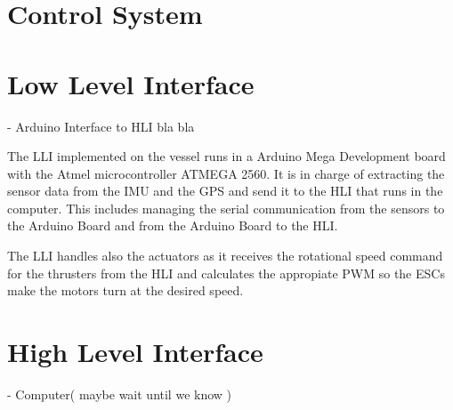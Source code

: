 \section{Control System}\label{sec:ControlComputation}

\section{Low Level Interface} - Arduino Interface to HLI bla bla

The LLI implemented on the vessel runs in a Arduino Mega Development board with the Atmel microcontroller ATMEGA 2560. It is in charge of extracting the sensor data from the IMU and the GPS and send it to the HLI that runs in the computer. This includes managing the serial communication from the sensors to the Arduino Board and from the Arduino Board to the HLI. 

The LLI handles also the actuators as it receives the rotational speed command for the thrusters from the HLI and calculates the appropiate PWM so the ESCs make the motors turn at the desired speed.

\section{High Level Interface} - Computer( maybe wait until we know )



